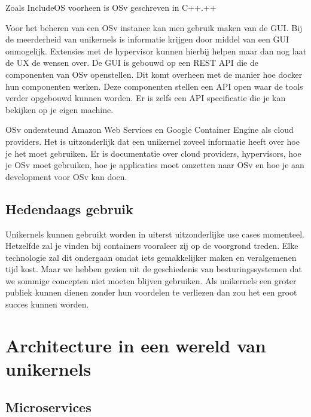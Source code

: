 \documentclass[pdftex,a4paper,12pt,twoside]{report}
\begin{document}
Zoals IncludeOS voorheen is OSv geschreven in C++.++

Voor het beheren van een OSv instance kan men gebruik maken van de GUI. Bij de meerderheid van unikernels is informatie krijgen door middel van een GUI onmogelijk. Extensies met de hypervisor kunnen hierbij helpen maar dan nog laat de UX de wensen over. De GUI is gebouwd op een REST API die de componenten van OSv openstellen. Dit komt overheen met de manier hoe docker hun componenten werken. Deze componenten stellen een API open waar de tools verder opgebouwd kunnen worden. Er is zelfs een API specificatie die je kan bekijken op je eigen machine.

OSv ondersteund Amazon Web Services en Google Container Engine als cloud providers. Het is uitzonderlijk dat een unikernel zoveel informatie heeft over hoe je het moet gebruiken. Er is documentatie over cloud providers, hypervisors, hoe je OSv moet gebruiken, hoe je applicaties moet omzetten naar OSv en hoe je aan development voor OSv kan doen.  

\section{Hedendaags gebruik}

Unikernels kunnen gebruikt worden in uiterst uitzonderlijke use cases momenteel. Hetzelfde zal je vinden bij containers vooraleer zij op de voorgrond treden. Elke technologie zal dit ondergaan omdat iets gemakkelijker maken en veralgemenen tijd kost. Maar we hebben gezien uit de geschiedenis van besturingssystemen dat we sommige concepten niet moeten blijven gebruiken. Als unikernels een groter publiek kunnen dienen zonder hun voordelen te verliezen dan zou het een groot succes kunnen worden. 

\chapter{Architecture in een wereld van unikernels}
\section{Microservices}
\end{document}

